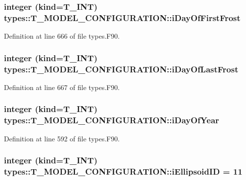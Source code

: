 \hypertarget{typetypes_1_1_t___m_o_d_e_l___c_o_n_f_i_g_u_r_a_t_i_o_n_a80bc3d1d4069de4e9c85c36dab171bb2}{
\subsubsection[{iDayOfFirstFrost}]{\setlength{\rightskip}{0pt plus 5cm}integer (kind={\bf T\_\-INT}) {\bf types::T\_\-MODEL\_\-CONFIGURATION::iDayOfFirstFrost}}}
\label{typetypes_1_1_t___m_o_d_e_l___c_o_n_f_i_g_u_r_a_t_i_o_n_a80bc3d1d4069de4e9c85c36dab171bb2}


Definition at line 666 of file types.F90.

\hypertarget{typetypes_1_1_t___m_o_d_e_l___c_o_n_f_i_g_u_r_a_t_i_o_n_a650bf97d4890d1fbde02542737cb79ca}{
\subsubsection[{iDayOfLastFrost}]{\setlength{\rightskip}{0pt plus 5cm}integer (kind={\bf T\_\-INT}) {\bf types::T\_\-MODEL\_\-CONFIGURATION::iDayOfLastFrost}}}
\label{typetypes_1_1_t___m_o_d_e_l___c_o_n_f_i_g_u_r_a_t_i_o_n_a650bf97d4890d1fbde02542737cb79ca}


Definition at line 667 of file types.F90.

\hypertarget{typetypes_1_1_t___m_o_d_e_l___c_o_n_f_i_g_u_r_a_t_i_o_n_afd430e9a2429e881bbfcccb7386d0fb4}{
\subsubsection[{iDayOfYear}]{\setlength{\rightskip}{0pt plus 5cm}integer (kind={\bf T\_\-INT}) {\bf types::T\_\-MODEL\_\-CONFIGURATION::iDayOfYear}}}
\label{typetypes_1_1_t___m_o_d_e_l___c_o_n_f_i_g_u_r_a_t_i_o_n_afd430e9a2429e881bbfcccb7386d0fb4}


Definition at line 592 of file types.F90.

\hypertarget{typetypes_1_1_t___m_o_d_e_l___c_o_n_f_i_g_u_r_a_t_i_o_n_abfe0a08dd20154be720b8ebac6001881}{
\subsubsection[{iEllipsoidID}]{\setlength{\rightskip}{0pt plus 5cm}integer (kind={\bf T\_\-INT}) {\bf types::T\_\-MODEL\_\-CONFIGURATION::iEllipsoidID} = 11}}
\label{typetypes_1_1_t___m_o_d_e_l___c_o_n_f_i_g_u_r_a_t_i_o_n_abfe0a08dd20154be720b8ebac6001881}



